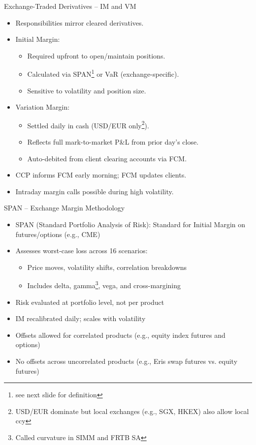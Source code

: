 \documentclass[handout, aspectratio=169]{beamer}
\begin{document}
\begin{frame}{Exchange-Traded Derivatives – IM and VM}
  \begin{itemize}
    \item Responsibilities mirror cleared derivatives.
    \item Initial Margin:
    \begin{itemize}
      \item Required upfront to open/maintain positions.
      \item Calculated via SPAN\footnote{see next slide for definition} or VaR (exchange-specific).
      \item Sensitive to volatility and position size.
    \end{itemize}
    \item Variation Margin:
    \begin{itemize}
      \item Settled daily in cash (USD/EUR only\footnote{USD/EUR dominate but local exchanges (e.g., SGX, HKEX) also allow local ccy}).
      \item Reflects full mark-to-market P\&L from prior day’s close.
      \item Auto-debited from client clearing accounts via FCM.
    \end{itemize}
    \item CCP informs FCM early morning; FCM updates clients.
    \item Intraday margin calls possible during high volatility.
  \end{itemize}
\end{frame}
  
\begin{frame}{SPAN – Exchange Margin Methodology}
  \begin{itemize}
    \item SPAN (Standard Portfolio Analysis of Risk): Standard for Initial Margin on futures/options (e.g., CME)
    \item Assesses worst-case loss across 16 scenarios:
    \begin{itemize}
      \item Price moves, volatility shifts, correlation breakdowns
      \item Includes delta, gamma\footnote{Called curvature in SIMM and FRTB SA}, vega, and cross-margining
    \end{itemize}
    \item Risk evaluated at portfolio level, not per product
    \item IM recalibrated daily; scales with volatility
    \item Offsets allowed for correlated products (e.g., equity index futures and options)
    \item No offsets across uncorrelated products (e.g., Eris swap futures vs. equity futures)
  \end{itemize}    
\end{frame}
    
\end{document}
